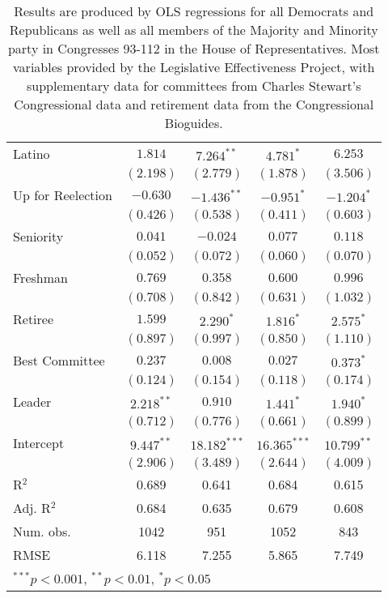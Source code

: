 \documentclass[12pt]{article}
\newcommand\fnote[1]{\captionsetup{font=small}\caption*{#1}}
\begin{document}
\begin{table}[H]
\begin{center}
\begin{tabular}{l c c c c }
			Latino                 & $1.814$        & $7.264^{**}$    & $4.781^{*}$    & $6.253$       \\
			& $(2.198)$      & $(2.779)$       & $(1.878)$      & $(3.506)$     \\
			Up for Reelection    & $-0.630$       & $-1.436^{**}$   & $-0.951^{*}$   & $-1.204^{*}$  \\
			& $(0.426)$      & $(0.538)$       & $(0.411)$      & $(0.603)$     \\
			Seniority              & $0.041$        & $-0.024$        & $0.077$        & $0.118$       \\
			& $(0.052)$      & $(0.072)$       & $(0.060)$      & $(0.070)$     \\
			Freshman               & $0.769$        & $0.358$         & $0.600$        & $0.996$       \\
			& $(0.708)$      & $(0.842)$       & $(0.631)$      & $(1.032)$     \\
			Retiree                & $1.599$        & $2.290^{*}$     & $1.816^{*}$    & $2.575^{*}$   \\
			& $(0.897)$      & $(0.997)$       & $(0.850)$      & $(1.110)$     \\
			Best Committee        & $0.237$        & $0.008$         & $0.027$        & $0.373^{*}$   \\
			& $(0.124)$      & $(0.154)$       & $(0.118)$      & $(0.174)$     \\
			Leader                 & $2.218^{**}$   & $0.910$         & $1.441^{*}$    & $1.940^{*}$   \\
			& $(0.712)$      & $(0.776)$       & $(0.661)$      & $(0.899)$     \\
			Intercept            & $9.447^{**}$   & $18.182^{***}$  & $16.365^{***}$ & $10.799^{**}$ \\
			& $(2.906)$      & $(3.489)$       & $(2.644)$      & $(4.009)$     \\
			\hline
			R$^2$                  & 0.689          & 0.641           & 0.684          & 0.615         \\
			Adj. R$^2$             & 0.684          & 0.635           & 0.679          & 0.608         \\
			Num. obs.              & 1042           & 951             & 1052           & 843           \\
			RMSE                   & 6.118          & 7.255           & 5.865          & 7.749         \\
			\hline
			\multicolumn{5}{l}{\scriptsize{$^{***}p<0.001$, $^{**}p<0.01$, $^*p<0.05$}}
		\end{tabular}
	\fnote{Results are produced by OLS regressions for all Democrats and Republicans as well as all members of the Majority and Minority party in Congresses 93-112 in the House of Representatives. Most variables provided by the Legislative Effectiveness Project, with supplementary data for committees from Charles Stewart's Congressional data and retirement data from the Congressional Bioguides.}
	\end{center}
\end{table}
\end{document}
